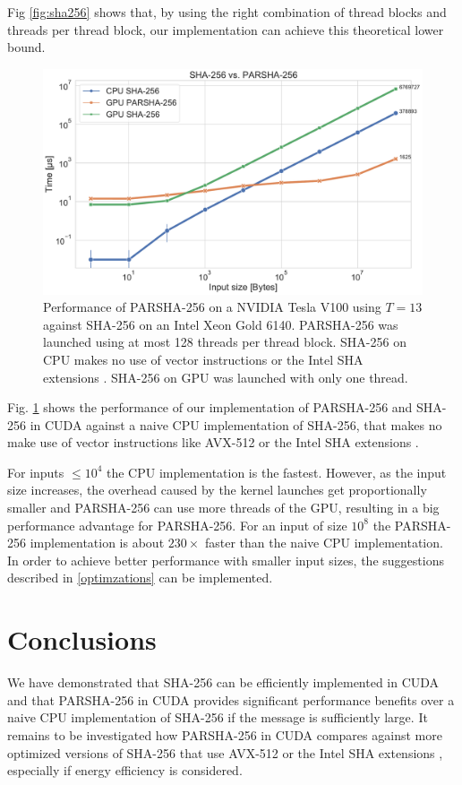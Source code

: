 \documentclass[letterpaper]{article}
\begin{document}
Fig \ref{fig:sha256} shows that, by using the right combination of thread blocks and  threads per thread block, our implementation can achieve this theoretical lower bound.


\begin{figure}[t]\centering
\includegraphics[scale=0.23]{plot_parsha.pdf}
  \caption{Performance of PARSHA-256 on a NVIDIA Tesla V100 using $T = 13$  against SHA-256 on an Intel Xeon Gold 6140. PARSHA-256 was launched using at most 128 threads per thread block. SHA-256 on CPU makes no use of vector instructions or the Intel SHA extensions \cite{SHA_Extensions}. SHA-256 on GPU was launched with only one thread.   \label{fig:parsha256}}
\end{figure}

Fig. \ref{fig:parsha256} shows the performance of our implementation of PARSHA-256 and SHA-256 in CUDA against a naive CPU implementation of SHA-256, that makes no make use of vector instructions like AVX-512 \cite{avx512} or the Intel SHA extensions \cite{SHA_Extensions}.

For inputs $\leq  10^4$ the CPU implementation is the fastest. However, as the input size increases, the overhead caused by the kernel launches get proportionally smaller and PARSHA-256 can use more threads of the GPU, resulting in a big performance advantage for PARSHA-256.
For an input of size $10^8$ the PARSHA-256 implementation is about $230 \times$ faster than the naive CPU implementation.
In order to achieve better performance with smaller input sizes, the suggestions described in \ref{optimzations} can be implemented.

\section{Conclusions}
We have demonstrated that SHA-256 can be efficiently implemented in CUDA and that PARSHA-256 in CUDA provides significant performance benefits over a naive CPU implementation of SHA-256 if the message is sufficiently large.
It remains to be investigated how PARSHA-256 in CUDA compares against more optimized versions of SHA-256 that use AVX-512 \cite{avx512} or the Intel SHA extensions \cite{SHA_Extensions}, especially if energy efficiency is considered.
\end{document}
